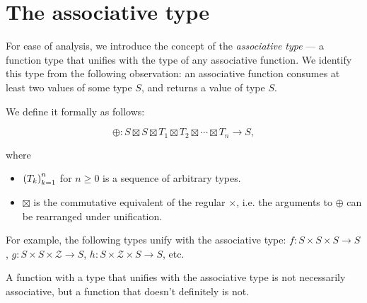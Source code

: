 \section{The associative type}\label{section:the-associative-type}

For ease of analysis, we introduce the concept of the \emph{associative type}
--- a function type that unifies with the type of any associative function. We
identify this type from the following observation: an associative function
consumes at least two values of some type $S$, and returns a value of type $S$.

We define it formally as follows:

\[\oplus:S \boxtimes S \boxtimes T_1 \boxtimes T_2 \boxtimes \cdots \boxtimes
T_n \rightarrow S, \]

where

\begin{itemize}

\item $\left({T_k}\right)_{k=1}^n$ for $n\geq 0$ is a sequence of arbitrary types.

\item $\boxtimes$ is the commutative equivalent of the regular $\times$, i.e.
the arguments to $\oplus$ can be rearranged under unification.

\end{itemize}

For example, the following types unify with the associative type: $f:S \times S
\times S \rightarrow S$, $g:S \times S \times \mathcal{Z} \rightarrow S$, $h:S
\times \mathcal{Z} \times S \rightarrow S$, etc.

A function with a type that unifies with the associative type is not
necessarily associative, but a function that doesn't definitely is not.
